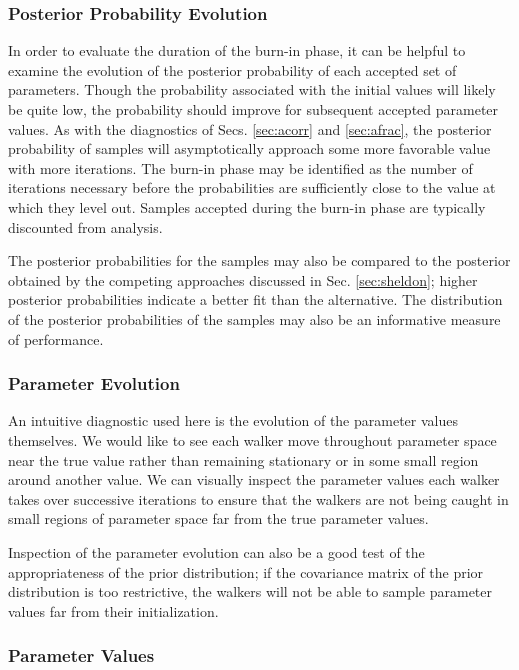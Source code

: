 \documentclass[preprint]{aastex}
\begin{document}
\clearpage
\subsubsection{Posterior Probability Evolution}
\label{sec:probs}

In order to evaluate the duration of the burn-in phase, it can be helpful to 
examine the evolution of the posterior probability of each accepted set of 
parameters.  Though the probability associated with the initial values will 
likely be quite low, the probability should improve for subsequent accepted 
parameter values.  As with the diagnostics of Secs. \ref{sec:acorr} and 
\ref{sec:afrac}, the posterior probability of samples will asymptotically 
approach some more favorable value with more iterations.  The burn-in phase may 
be identified as the number of iterations necessary before the probabilities 
are sufficiently close to the value at which they level out.  Samples accepted 
during the burn-in phase are typically discounted from analysis.  

The posterior probabilities for the samples may also be compared to the 
posterior obtained by the competing approaches discussed in Sec. 
\ref{sec:sheldon}; higher posterior probabilities indicate a better fit than 
the alternative.  The distribution of the posterior probabilities of the 
samples may also be an informative measure of performance.

\clearpage
\subsubsection{Parameter Evolution}
\label{sec:params}

An intuitive diagnostic used here is the evolution of the parameter values 
themselves.  We would like to see each walker move throughout parameter space 
near the true value rather than remaining stationary or in some small region 
around another value.  We can visually inspect the parameter values each walker 
takes over successive iterations to ensure that the walkers are not being 
caught in small regions of parameter space far from the true parameter values.  

Inspection of the parameter evolution can also be a good test of the 
appropriateness of the prior distribution; if the covariance matrix of the 
prior distribution is too restrictive, the walkers will not be able to sample 
parameter values far from their initialization.  

\clearpage
\subsubsection{Parameter Values}
\label{sec:samps}
\end{document}
